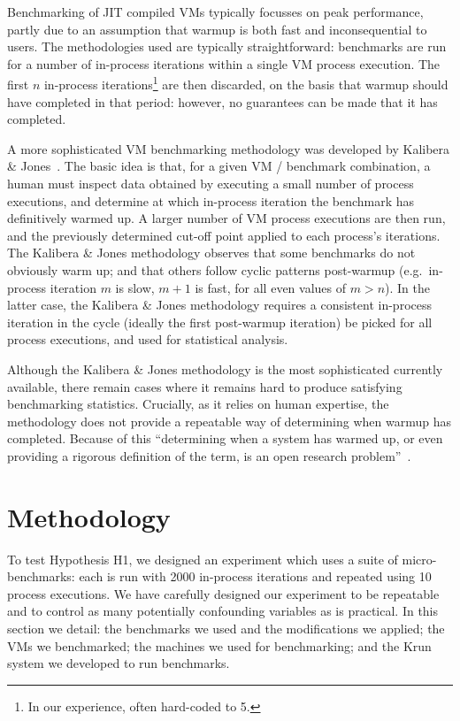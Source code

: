 \documentclass[preprint,numbers,10pt]{sigplanconf}
\newcommand{\kalibera}{Kalibera \& Jones\xspace}
\newcommand{\krun}{Krun\xspace}
\begin{document}
Benchmarking of JIT compiled VMs typically focusses on peak
performance, partly due to an assumption that
warmup is both fast and inconsequential to users.
The methodologies used are typically straightforward: benchmarks are run for a number
of in-process iterations within a single VM process execution.
The first $n$ in-process iterations\footnote{In our experience, often hard-coded
to 5.} are then discarded, on the basis that warmup should have completed in
that period: however, no guarantees can be made that it has completed.

A more sophisticated VM benchmarking methodology
was developed by \kalibera~\cite{kalibera12quantifying,kalibera13rigorous}. The basic idea is
that, for a given VM / benchmark combination, a human must inspect data obtained by
executing a small number of process executions, and determine at which in-process iteration the
benchmark has definitively warmed up. A larger number of VM process executions are then
run, and the previously determined cut-off point applied to each process's
iterations. The \kalibera methodology observes that some benchmarks do not
obviously warm up; and that others follow cyclic patterns post-warmup
(e.g.~in-process iteration $m$ is slow, $m+1$ is fast, for all even values of $m > n$). In
the latter case, the \kalibera methodology requires a consistent in-process iteration in
the cycle (ideally the first post-warmup iteration) be picked for all process
executions, and used for statistical analysis.

Although the \kalibera methodology is the most
sophisticated currently available,
there remain cases where it remains hard to produce satisfying benchmarking
statistics. Crucially, as it relies on human expertise, the methodology does not
provide a repeatable way of determining when warmup has completed. Because of this
``determining when a system has warmed up, or even providing a
rigorous definition of the term, is an open research problem''~\cite{seaton15phd}.


\section{Methodology}
\label{sec:methodology}

To test Hypothesis H1, we designed an experiment which uses a suite of
micro-benchmarks: each is run with 2000 in-process iterations and repeated
using 10 process executions. We have carefully designed our
experiment to be repeatable and to control as many potentially confounding variables as
is practical. In this section we detail: the benchmarks we used and the modifications we
applied; the VMs we benchmarked; the machines we used for benchmarking; and the
\krun system we developed to run benchmarks.
\end{document}
